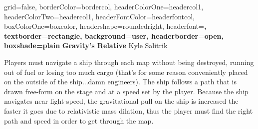 \documentclass[archE1,portrait]{baposter}
\begin{document}
\background{ %

}

\begin{poster}{
grid=false,
borderColor=bordercol, %
headerColorOne=headercol1, %
headerColorTwo=headercol1, %
headerFontColor=headerfontcol, %
boxColorOne=boxcolor, %
headershape=roundedright, %
headerfont=\Large\sf\bf, %
textborder=rectangle,
background=user,
headerborder=open, %
boxshade=plain
}
{}
%
%
{
\sf\bf Gravity's Relative} %
{\vspace{1em} Kyle Salitrik\\ %
} %
%


{
	\quad Players must navigate a ship through each map without being destroyed, running out of fuel or losing too much cargo (that's for some reason conveniently placed on the outside of the ship...damn engineers). The ship follows a path that is drawn free-form on the stage and at a speed set by the player. Because the ship navigates near light-speed, the gravitational pull on the ship is increased the faster it goes due to relativistic mass dilation, thus the player must find the right path and speed in order to get through the map.
}



\end{poster}
\end{document}
